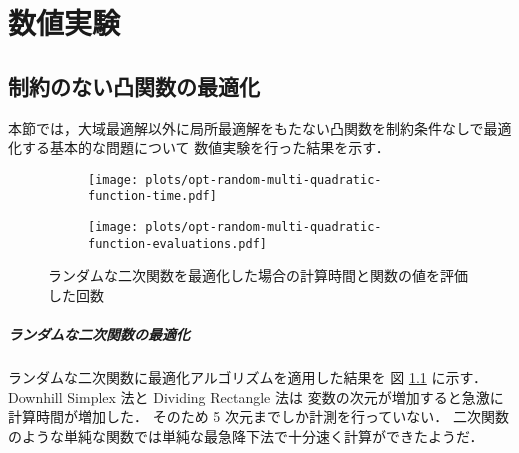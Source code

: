 %

\chapter{数値実験}

\section{制約のない凸関数の最適化}

本節では，大域最適解以外に局所最適解をもたない凸関数を制約条件なしで最適化する基本的な問題について
数値実験を行った結果を示す．

\begin{figure}[tp]
    \centering
    \begin{subfigure}{0.85\linewidth}
        \centering
        \texttt{[image: plots/opt-random-multi-quadratic-function-time.pdf]}
    \end{subfigure}
    \begin{subfigure}{0.85\linewidth}
        \centering
        \texttt{[image: plots/opt-random-multi-quadratic-function-evaluations.pdf]}
    \end{subfigure}
    \caption{ランダムな二次関数を最適化した場合の計算時間と関数の値を評価した回数}
    \label{fig:optimization_unconstrained-convex-optimization_random-multi-quadratic-function}
\end{figure}

\paragraph{ランダムな二次関数の最適化}
ランダムな二次関数に最適化アルゴリズムを適用した結果を
図 \ref{fig:optimization_unconstrained-convex-optimization_random-multi-quadratic-function} に示す．
Downhill Simplex 法と Dividing Rectangle 法は
変数の次元が増加すると急激に計算時間が増加した．
そのため 5 次元までしか計測を行っていない．
二次関数のような単純な関数では単純な最急降下法で十分速く計算ができたようだ．

\clearpage
